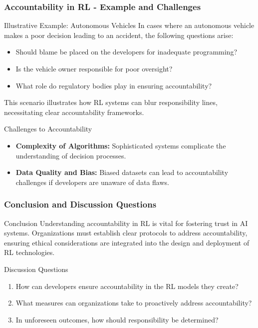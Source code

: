 \documentclass[aspectratio=169]{beamer}
\begin{document}
\begin{frame}[fragile]
  \frametitle{Accountability in RL - Example and Challenges}

  \begin{block}{Illustrative Example: Autonomous Vehicles}
    In cases where an autonomous vehicle makes a poor decision leading to an accident, the following questions arise:
    \begin{itemize}
      \item Should blame be placed on the developers for inadequate programming?
      \item Is the vehicle owner responsible for poor oversight?
      \item What role do regulatory bodies play in ensuring accountability?
    \end{itemize}
    This scenario illustrates how RL systems can blur responsibility lines, necessitating clear accountability frameworks.
  \end{block}

  \begin{block}{Challenges to Accountability}
    \begin{itemize}
      \item \textbf{Complexity of Algorithms:} Sophisticated systems complicate the understanding of decision processes.
      \item \textbf{Data Quality and Bias:} Biased datasets can lead to accountability challenges if developers are unaware of data flaws.
    \end{itemize}
  \end{block}
  
\end{frame}

\begin{frame}[fragile]
  \frametitle{Conclusion and Discussion Questions}
  
  \begin{block}{Conclusion}
    Understanding accountability in RL is vital for fostering trust in AI systems. Organizations must establish clear protocols to address accountability, ensuring ethical considerations are integrated into the design and deployment of RL technologies.
  \end{block}

  \begin{block}{Discussion Questions}
    \begin{enumerate}
      \item How can developers ensure accountability in the RL models they create?
      \item What measures can organizations take to proactively address accountability?
      \item In unforeseen outcomes, how should responsibility be determined?
    \end{enumerate}
  \end{block}
  
\end{frame}
\end{document}

